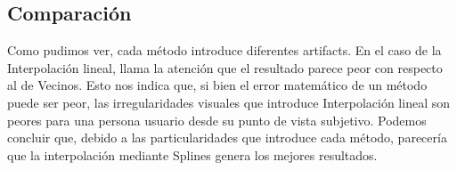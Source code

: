 \subsection{Comparación}

Como pudimos ver, cada método introduce diferentes artifacts. En el caso de la Interpolación lineal, llama la atención que el resultado parece peor con respecto al de Vecinos. Esto nos indica que, si bien el error matemático de un método puede ser peor, las irregularidades visuales que introduce Interpolación lineal son peores para una persona usuario desde su punto de vista subjetivo.
Podemos concluir que, debido a las particularidades que introduce cada método, parecería que la interpolación mediante Splines genera los mejores resultados.
